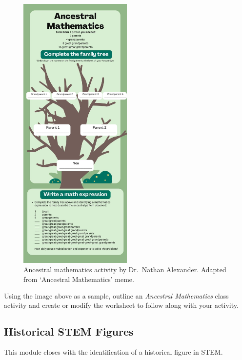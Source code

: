 \documentclass[
  letterpaper,
  DIV=11,
  numbers=noendperiod]{scrartcl}
\begin{document}
\begin{figure}[H]

{\centering \includegraphics[width=0.5\textwidth,height=\textheight]{../img/mod03/ancestral-mathematics.jpg}

}

\caption{Ancestral mathematics activity by Dr.~Nathan Alexander. Adapted
from `Ancestral Mathematics' meme.}

\end{figure}%

Using the image above as a sample, outline an \emph{Ancestral
Mathematics} class activity and create or modify the worksheet to follow
along with your activity.

\subsection{Historical STEM Figures}\label{historical-stem-figures}

This module closes with the identification of a historical figure in
STEM.
\end{document}
